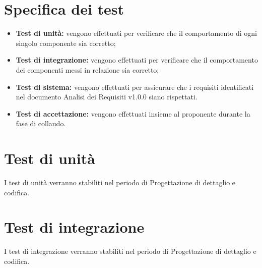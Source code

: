 \section{Specifica dei test}

\begin{itemize}
    \item \textbf{Test di unità:} vengono effettuati per verificare che il comportamento di ogni singolo componente sia corretto;
    \item \textbf{Test di integrazione:} vengono effettuati per verificare che il comportamento dei componenti messi in relazione sia corretto;
    \item \textbf{Test di sistema:} vengono effettuati per assicurare che i requisiti identificati nel documento Analisi dei Requisiti v1.0.0 siano rispettati.
    \item \textbf{Test di accettazione:} vengono effettuati insieme al proponente durante la fase di collaudo.
\end{itemize}
\section{Test di unità}
I test di unità verranno stabiliti nel periodo di Progettazione di dettaglio e codifica.

\section{Test di integrazione}
I test di integrazione verranno stabiliti nel periodo di Progettazione di dettaglio e codifica.

